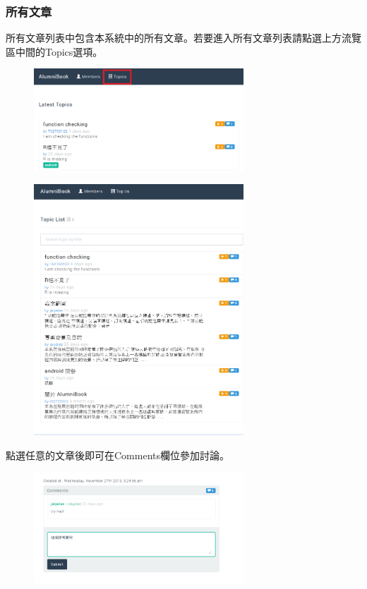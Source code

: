 \documentclass[12pt]{article}
\begin{document}
\subsubsection{所有文章}
所有文章列表中包含本系統中的所有文章。若要進入所有文章列表請點選上方流覽區中間的Topics選項。
\begin{figure}[H]
\centering\includegraphics[width=0.7\textwidth]{img/read02.png}
\end{figure}
\begin{figure}[H]
\centering\includegraphics[width=0.7\textwidth]{img/read03.png}
\end{figure}
點選任意的文章後即可在Comments欄位參加討論。
\begin{figure}[H]
\centering\includegraphics[width=0.7\textwidth]{img/read04.png}
\end{figure}
\end{document}
